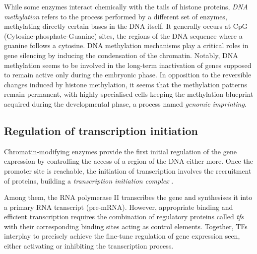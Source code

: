 While some enzymes interact chemically with the tails of histone proteins, \textit{DNA methylation} refers to the process performed by a different set of enzymes, methylating directly certain bases in the DNA itself. It generally occurs at CpG (Cytosine-phosphate-Guanine) sites, the regions of the DNA sequence where a guanine follows a cytosine. DNA methylation mechanisms play a critical roles in gene silencing by inducing the condensation of the chromatin. Notably, DNA methylation seems to be involved in the long-term inactivation of genes supposed to remain active only during the embryonic phase. In opposition to the reversible changes induced by histone methylation, it seems that the methylation patterns remain permanent, with highly-specialised cells keeping the methylation blueprint acquired during the developmental phase, a process named \textit{genomic imprinting}. 


\subsection{Regulation of transcription initiation}
\label{subsec:reg-transcript}
Chromatin-modifying enzymes provide the first initial regulation of the
gene expression by controlling the access of a region of the DNA either more. Once the promoter site is reachable, the initiation of transcription involves the recruitment of proteins, building a \textit{transcription initiation complex} .

Among them, the RNA polymerase II transcribes the gene and synthesises it into a primary RNA transcript (pre-mRNA). However, appropriate binding and efficient transcription requires the combination of regulatory proteins called \textit{\Glspl{tf}} with their corresponding binding sites acting as control elements.  Together, TFs interplay to precisely achieve the fine-tune regulation of gene expression seen, either activating or inhibiting the transcription process.



